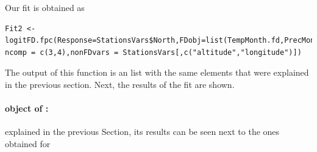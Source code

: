 Our fit is obtained as

\begin{verbatim}
Fit2 <- logitFD.fpc(Response=StationsVars$North,FDobj=list(TempMonth.fd,PrecMonth.fd),
ncomp = c(3,4),nonFDvars = StationsVars[,c("altitude","longitude")])
\end{verbatim}

The output of this function is an  list with the same elements that were explained in the previous section. Next, the results of the fit are shown.

\paragraph{ object of :} explained in the previous Section, its results can be seen next to the ones obtained for  

